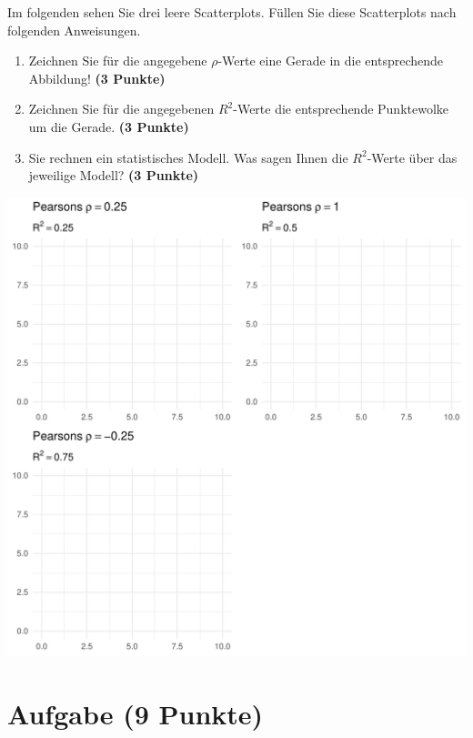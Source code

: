 \documentclass[a4paper, 9pt]{scrartcl}\usepackage[]{graphicx}\usepackage[]{xcolor}
\makeatletter
\def\maxwidth{ %
  \ifdim\Gin@nat@width>\linewidth
    \linewidth
  \else
    \Gin@nat@width
  \fi
}
\makeatother
\begin{document}
Im folgenden sehen Sie drei leere Scatterplots. F{\"u}llen Sie diese
Scatterplots nach folgenden Anweisungen.

\begin{enumerate}
\item Zeichnen Sie f{\"u}r die angegebene $\rho$-Werte eine Gerade in die
  entsprechende Abbildung! \textbf{(3 Punkte)}
\item Zeichnen Sie f{\"u}r die angegebenen $R^2$-Werte die entsprechende
  Punktewolke um die Gerade. \textbf{(3 Punkte)}
\item Sie rechnen ein statistisches Modell. Was sagen Ihnen die $R^2$-Werte
  {\"u}ber das jeweilige Modell? \textbf{(3 Punkte)}
\end{enumerate}




{\centering \includegraphics[width=\maxwidth]{img/correlation-01-1} 

}



 
\clearpage

\section{Aufgabe \hfill (9 Punkte)}
\end{document}
